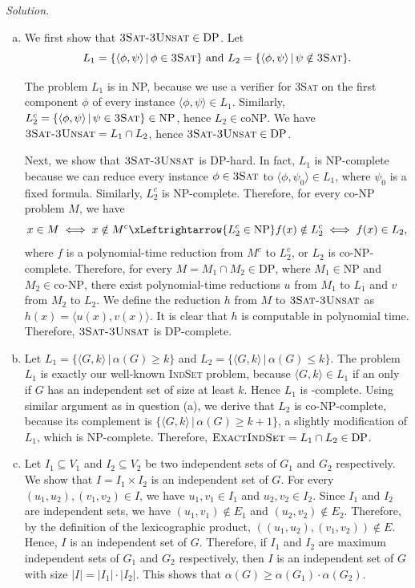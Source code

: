 \textit{Solution.}
\begin{enumerate}[(a)]
  \item We first show that $\textsc{3Sat-3Unsat}\in \text{DP}$. Let
        $$L_1 = \{\langle \phi,\psi\rangle \,|\, \phi\in\textsc{3Sat}\} \text{ and } L_2 = \{\langle \phi,\psi\rangle \,|\, \psi\notin\textsc{3Sat}\}.$$

        The problem $L_1$ is in NP, because we use a verifier for \textsc{3Sat} on the first component $\phi$ of every instance $\langle \phi,\psi\rangle\in L_1$. Similarly, $L_2^c = \{\langle \phi,\psi\rangle \,|\, \psi\in\textsc{3Sat}\} \in \text{NP}$, hence $L_2\in \text{coNP}$. We have $\textsc{3Sat-3Unsat} = L_1\cap L_2$, hence $\textsc{3Sat-3Unsat}\in \text{DP}$.

        Next, we show that $\textsc{3Sat-3Unsat}$ is DP-hard. In fact, $L_1$ is NP-complete because we can reduce every instance $\phi\in \textsc{3Sat}$ to $\langle \phi,\psi_0\rangle\in L_1$, where $\psi_0$ is a fixed formula. Similarly, $L_2^c$ is NP-complete. Therefore, for every co-NP problem $M$, we have
        $$x\in M \iff x \notin M^c \xLeftrightarrow{L_2^c\in \text{NP}} f(x)\notin L_2^c \iff f(x)\in L_2,$$
        where $f$ is a polynomial-time reduction from $M^c$ to $L_2^c$, or $L_2$ is co-NP-complete. Therefore, for every $M = M_1\cap M_2\in \text{DP}$, where $M_1\in \text{NP}$ and $M_2\in\text{co-NP}$, there exist polynomial-time reductions $u$ from $M_1$ to $L_1$ and $v$ from $M_2$ to $L_2$. We define the reduction $h$ from $M$ to $\textsc{3Sat-3Unsat}$ as
        $h(x) = \langle u(x),v(x)\rangle.$
        It is clear that $h$ is computable in polynomial time. Therefore, $\textsc{3Sat-3Unsat}$ is DP-complete.
  \item Let $L_1 = \{\langle G,k\rangle \,|\, \alpha(G)\ge k\}$ and $L_2 = \{\langle G,k\rangle \,|\, \alpha(G)\le k\}$. The problem $L_1$ is exactly our well-known \textsc{IndSet} problem, because $\langle G,k\rangle\in L_1$ if an only if $G$ has an independent set of size at least $k$. Hence $L_1$ is -complete. Using similar argument as in question (a), we derive that $L_2$ is co-NP-complete, because its complement is $\{\langle G,k\rangle \,|\, \alpha(G) \ge k+1\}$, a slightly modification of $L_1$, which is NP-complete. Therefore, $\textsc{ExactIndSet} = L_1\cap L_2\in \text{DP}$.
  \item Let $I_1\subseteq V_1$ and $I_2\subseteq V_2$ be two independent sets of $G_1$ and $G_2$ respectively. We show that $I = I_1\times I_2$ is an independent set of $G$. For every $(u_1,u_2),(v_1,v_2)\in I$, we have $u_1,v_1\in I_1$ and $u_2,v_2\in I_2$. Since $I_1$ and $I_2$ are independent sets, we have $(u_1,v_1)\notin E_1$ and $(u_2,v_2)\notin E_2$. Therefore, by the definition of the lexicographic product, $((u_1,u_2),(v_1,v_2))\notin E$. Hence, $I$ is an independent set of $G$. Therefore, if $I_1$ and $I_2$ are maximum independent sets of $G_1$ and $G_2$ respectively, then $I$ is an independent set of $G$ with size $|I| = |I_1|\cdot |I_2|$. This shows that $\alpha(G)\ge \alpha(G_1)\cdot \alpha(G_2)$.


\end{enumerate}
